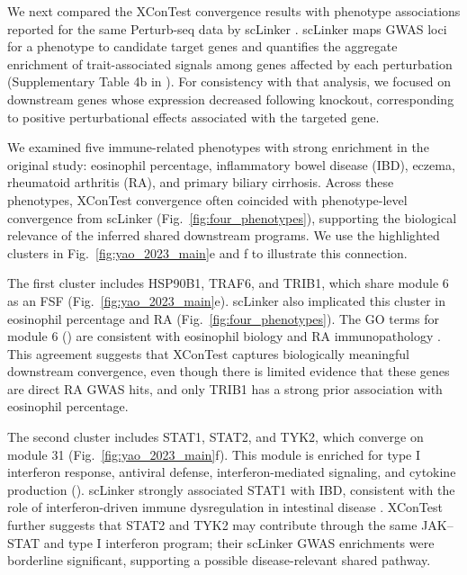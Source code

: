 \documentclass[11pt]{article}
\begin{document}
We next compared the XConTest convergence results with phenotype associations reported for the same Perturb-seq data by scLinker \citep{Jagadeesh:2022,yao2024scalable}. scLinker maps GWAS loci for a phenotype to candidate target genes and quantifies the aggregate enrichment of trait-associated signals among genes affected by each perturbation (Supplementary Table 4b in \citealp{yao2024scalable}). For consistency with that analysis, we focused on downstream genes whose expression decreased following knockout, corresponding to positive perturbational effects associated with the targeted gene.

We examined five immune-related phenotypes with strong enrichment in the original study: eosinophil percentage, inflammatory bowel disease (IBD), eczema, rheumatoid arthritis (RA), and primary biliary cirrhosis. Across these phenotypes, XConTest convergence often coincided with phenotype-level convergence from scLinker (Fig.~\ref{fig:four_phenotypes}), supporting the biological relevance of the inferred shared downstream programs. We use the highlighted clusters in Fig.~\ref{fig:yao_2023_main}e and f to illustrate this connection.  

The first cluster includes HSP90B1, TRAF6, and TRIB1, which share module 6 as an FSF (Fig.~\ref{fig:yao_2023_main}e). scLinker also implicated this cluster in eosinophil percentage and RA (Fig.~\ref{fig:four_phenotypes}). The GO terms for module 6 () are consistent with eosinophil biology \citep{Fulkerson:2013,Davoine:2014,Jacobsen:2007,Lombardi:2022} and RA immunopathology \citep{mcinnes2011pathogenesis,firestein2003evolving}. This agreement suggests that XConTest captures biologically meaningful downstream convergence, even though there is limited evidence that these genes are direct RA GWAS hits, and only TRIB1 has a strong prior association with eosinophil percentage.

The second cluster includes STAT1, STAT2, and TYK2, which converge on module 31 (Fig.~\ref{fig:yao_2023_main}f). This module is enriched for type I interferon response, antiviral defense, interferon-mediated signaling, and cytokine production (). scLinker strongly associated STAT1 with IBD, consistent with the role of interferon-driven immune dysregulation in intestinal disease \citep{Tarris:2021,Honap:2024,Giles:2017,Cadwell:2010}. XConTest further suggests that STAT2 and TYK2 may contribute through the same JAK--STAT and type I interferon program; their scLinker GWAS enrichments were borderline significant, supporting a possible disease-relevant shared pathway.
\end{document}

